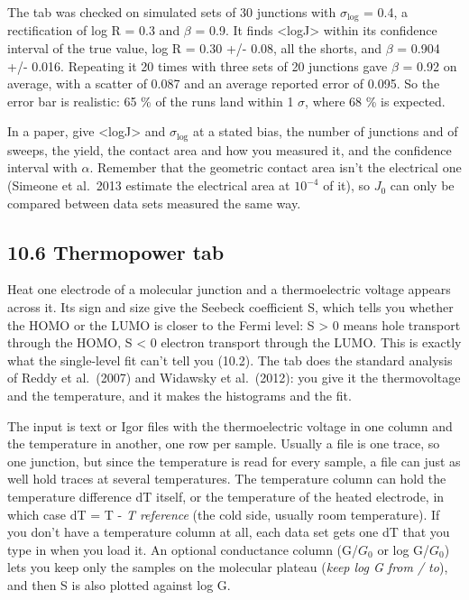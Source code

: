 \documentclass[
  11pt,
  a4paper,
]{article}
\begin{document}
The tab was checked on simulated sets of 30 junctions with
$\sigma_\mathrm{log}$ = 0.4, a rectification of log R = 0.3 and $\beta$
= 0.9. It finds \textless log\textbar J\textbar\textgreater{} within its
confidence interval of the true value, log R = 0.30 +/- 0.08, all the
shorts, and $\beta$ = 0.904 +/- 0.016. Repeating it 20 times with three
sets of 20 junctions gave $\beta$ = 0.92 on average, with a scatter of
0.087 and an average reported error of 0.095. So the error bar is
realistic: 65 \% of the runs land within 1 $\sigma$, where 68 \% is
expected.

In a paper, give \textless log\textbar J\textbar\textgreater{} and
$\sigma_\mathrm{log}$ at a stated bias, the number of junctions and of
sweeps, the yield, the contact area and how you measured it, and the
confidence interval with $\alpha$. Remember that the geometric contact
area isn't the electrical one (Simeone et al.~2013 estimate the
electrical area at $10^{-4}$ of it), so $J_0$ can only be compared
between data sets measured the same way.

\hypertarget{thermopower-tab}{%
\subsection{10.6 Thermopower tab}\label{thermopower-tab}}

Heat one electrode of a molecular junction and a thermoelectric voltage
appears across it. Its sign and size give the Seebeck coefficient S,
which tells you whether the HOMO or the LUMO is closer to the Fermi
level: S \textgreater{} 0 means hole transport through the HOMO, S
\textless{} 0 electron transport through the LUMO. This is exactly what
the single-level fit can't tell you (10.2). The tab does the standard
analysis of Reddy et al.~(2007) and Widawsky et al.~(2012): you give it
the thermovoltage and the temperature, and it makes the histograms and
the fit.

The input is text or Igor files with the thermoelectric voltage in one
column and the temperature in another, one row per sample. Usually a
file is one trace, so one junction, but since the temperature is read
for every sample, a file can just as well hold traces at several
temperatures. The temperature column can hold the temperature difference
dT itself, or the temperature of the heated electrode, in which case dT
= T - \emph{T reference} (the cold side, usually room temperature). If
you don't have a temperature column at all, each data set gets one dT
that you type in when you load it. An optional conductance column
(G/$G_0$ or log G/$G_0$) lets you keep only the samples on the molecular
plateau (\emph{keep log G from / to}), and then S is also plotted
against log G.
\end{document}
